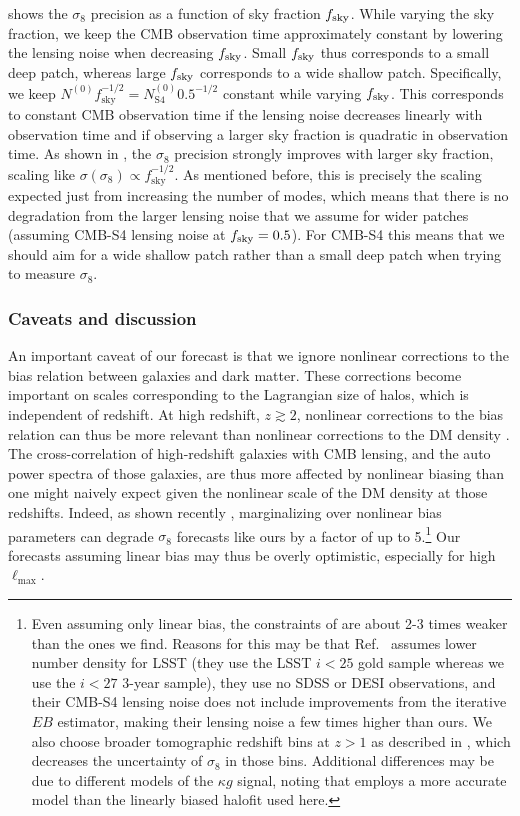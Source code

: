 \documentclass[prd,superscriptaddress,floatfix,notitlepage,nofootinbib,reprint]{revtex4-1} %
\begin{document}
 shows the $\sigma_8$ precision as a function of sky fraction ${f_\mathrm{sky}}$.
While varying the sky fraction, we keep the CMB observation time approximately constant by lowering the lensing noise when decreasing ${f_\mathrm{sky}}$.
Small ${f_\mathrm{sky}}$ thus corresponds to a small deep patch, whereas large ${f_\mathrm{sky}}$ corresponds to a wide shallow patch.
Specifically, we keep $N^{(0)}f_\mathrm{sky}^{-1/2}=N^{(0)}_\mathrm{S4}0.5^{-1/2}$ constant while varying ${f_\mathrm{sky}}$.
This corresponds to constant CMB observation time if the lensing noise decreases linearly with observation time and if observing a larger sky fraction is quadratic in observation time.
As shown in , the $\sigma_8$ precision strongly improves with larger sky fraction, scaling like $\sigma(\sigma_8)\propto f_\mathrm{sky}^{-1/2}$.
As mentioned before, this is precisely the scaling expected just from increasing the number of modes, which means that there is no degradation from the larger lensing noise that we assume for wider patches (assuming CMB-S4 lensing noise at ${f_\mathrm{sky}}=0.5$).
For CMB-S4 this means that we should aim for a wide shallow patch rather than a small deep patch when trying to measure $\sigma_8$.



\subsubsection{Caveats and discussion}
\label{se:Sigma8Caveats}
An important caveat of our forecast is that we ignore nonlinear corrections to the bias relation between galaxies and dark matter.
These corrections become important on scales corresponding to the Lagrangian size of halos, which is independent of redshift.
At high redshift, $z\gtrsim 2$, nonlinear corrections to the bias relation can thus be more relevant than nonlinear corrections to the DM density \cite{Modi1706}. 
The cross-correlation of high-redshift galaxies with CMB lensing, and the auto power spectra of those galaxies, are thus more affected by nonlinear biasing than one might naively expect given the nonlinear scale of the DM density at those redshifts.
Indeed, as shown recently \cite{Modi1706}, marginalizing over nonlinear bias parameters can degrade  $\sigma_8$ forecasts like ours by a factor of up to 5.\footnote{Even assuming only linear bias, the constraints of \cite{Modi1706} are  about 2-3 times weaker than the ones we find.
Reasons for this may be that Ref.~\cite{Modi1706} assumes lower number density for LSST (they use the LSST $i<25$ gold sample whereas we use the $i<27$ 3-year sample), they use no SDSS or DESI observations, and their CMB-S4 lensing noise does not include improvements from the iterative $EB$ estimator, making their lensing noise a few times higher than ours.
We also choose broader tomographic redshift bins at $z>1$ as described in , which decreases the uncertainty of $\sigma_8$ in those bins.
Additional differences may be due to different models of the $\kappa g$ signal, noting that  \cite{Modi1706} employs a more accurate model than the linearly biased halofit used here.
}
Our forecasts assuming linear bias may thus be overly optimistic, especially for high $\ell_\mathrm{max}$.
\end{document}
